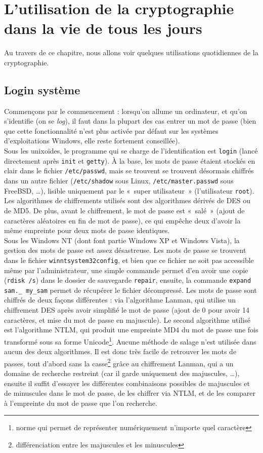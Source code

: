 \section{L'utilisation de la cryptographie dans la vie de tous les
jours}
Au travers de ce chapitre, nous allons voir quelques utilisations
quotidiennes de la cryptographie.
 
\subsection{Login système}
Commençons par le commencement : lorsqu'on allume un ordinateur,
et qu'on s'identifie (on se \emph{log}), il faut dans la plupart
des cas entrer un mot de passe (bien que cette fonctionnalité
n'est plus activée par défaut sur les systèmes d'exploitations
Windows, elle reste fortement conseillée).
\\
 
Sous les unixoïdes, le programme qui se charge de
l'identification est \texttt{login} (lancé directement après
\texttt{init} et \texttt{getty}). À la base, les mots de passe
étaient stockés en clair dans le fichier \texttt{/etc/passwd},
mais se trouvent se trouvent désormais chiffrés dans un autre
fichier (\texttt{/etc/shadow} sous Linux,
\texttt{/etc/master.passwd} sous FreeBSD, …), 
lisible uniquement par le «~super utilisateur~»
(l'utilisateur \texttt{root}).
Les algorithmes de chiffrements
utilisés sont des algorithmes dérivés de DES ou de MD5.
 De plus, avant le chiffrement, le mot
de passe est «~salé~» (ajout de caractères aléatoires en fin de
mot de passe), ce qui empêche deux d'avoir
la même empreinte pour deux mots de passe identiques.
\\
 
Sous les Windows NT (dont font partie Windows XP et Windows
Vista), la gestion des mots de passe est assez désastreuse. Les
mots de passe se trouvent dans le fichier
\texttt{\bslash winnt\bslash system32\bslash config}, et bien
que ce fichier ne soit pas
accessible même par l'administrateur, une simple commande permet
d'en avoir une copie (\texttt{rdisk /s}) dans le dossier de
sauvegarde \texttt{repair}, ensuite, la commande \texttt{expand
sam.\_ my\_sam}
permet de récupérer le fichier décompressé.
Les mots de passe sont chiffrés de deux façons différentes : via
l'algorithme Lanman, qui utilise un chiffrement DES après avoir
simplifié le mot de passe (ajout de 0 pour avoir 14 caractères, et
mise du mot de passe en majuscule).
Le second algorithme utilisé est l'algorithme NTLM, qui produit
une empreinte MD4 du mot de passe une fois transformé sous sa
forme Unicode\footnote{norme qui permet de représenter
numériquement n'importe quel caractère}.
 Aucune méthode de salage n'est utilisée dans aucun
des deux algorithmes. Il est donc très facile de retrouver les
mots de passes, tout d'abord sans la casse\footnote{différenciation
entre les majuscules et les minuscules} grâce au chiffrement
Lanman, qui a un domaine de recherche restreint (car il garde 
uniquement des
majuscules, …), ensuite il suffit d'essayer les différentes
combinaisons possibles de majuscules et de minuscules dans le mot
de passe, de les chiffrer via NTLM, et de les comparer à
l'empreinte du mot de passe que l'on recherche. 
\\
 
